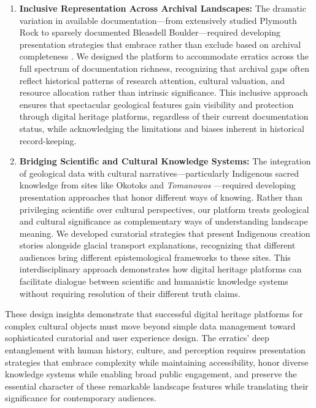 \begin{enumerate}
    \item \textbf{Inclusive Representation Across Archival Landscapes:} The dramatic variation in available documentation—from extensively studied Plymouth Rock to sparsely documented Bleasdell Boulder—required developing presentation strategies that embrace rather than exclude based on archival completeness \cite{LTCBleasdell, Delcourt1991}. We designed the platform to accommodate erratics across the full spectrum of documentation richness, recognizing that archival gaps often reflect historical patterns of research attention, cultural valuation, and resource allocation rather than intrinsic significance. This inclusive approach ensures that spectacular geological features gain visibility and protection through digital heritage platforms, regardless of their current documentation status, while acknowledging the limitations and biases inherent in historical record-keeping.
    \item \textbf{Bridging Scientific and Cultural Knowledge Systems:} The integration of geological data with cultural narratives—particularly Indigenous sacred knowledge from sites like Okotoks and \emph{Tomanowos} \cite{Delcourt1991, Klassen1995, ourtimebdTomanowosMeteorite, statesmanjournalPiecesSacred}—required developing presentation approaches that honor different ways of knowing. Rather than privileging scientific over cultural perspectives, our platform treats geological and cultural significance as complementary ways of understanding landscape meaning. We developed curatorial strategies that present Indigenous creation stories alongside glacial transport explanations, recognizing that different audiences bring different epistemological frameworks to these sites. This interdisciplinary approach demonstrates how digital heritage platforms can facilitate dialogue between scientific and humanistic knowledge systems without requiring resolution of their different truth claims.
\end{enumerate}

These design insights demonstrate that successful digital heritage platforms for complex cultural objects must move beyond simple data management toward sophisticated curatorial and user experience design. The erratics' deep entanglement with human history, culture, and perception requires presentation strategies that embrace complexity while maintaining accessibility, honor diverse knowledge systems while enabling broad public engagement, and preserve the essential character of these remarkable landscape features while translating their significance for contemporary audiences.

